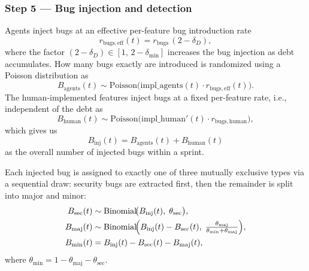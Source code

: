 \documentclass[smallextended]{svjour3}       %
\begin{document}
\subsubsection*{Step 5 --- Bug injection and detection}
Agents inject bugs at an effective per-feature bug introduction rate
\begin{equation}
  r_\mathrm{bugs,eff}(t) = r_\mathrm{bugs}\,(2 - \delta_D),
  \label{eq:r_bugs_eff}
\end{equation}
where the factor $(2 - \delta_D) \in [1,\, 2 - \delta_\mathrm{min}]$ increases the bug injection as debt accumulates. How many bugs exactly are introduced is randomized using a Poisson distribution as
\begin{equation}
  B_\mathrm{agents}(t) \sim
    \mathrm{Poisson}\!\bigl(\mathrm{impl\_agents}(t)\cdot r_\mathrm{bugs,eff}(t)\bigr).
  \label{eq:Binj-agent}
\end{equation}
The human-implemented features inject bugs at a fixed per-feature rate, i.e., independent of the debt as
\begin{equation}
  B_\mathrm{human}(t)  \sim
    \mathrm{Poisson}\!\bigl(\mathrm{impl\_human}'(t)\cdot r_\mathrm{bugs,human}\bigr),
  \label{eq:Binj-human}
\end{equation}
which gives us
\begin{equation}
  B_\mathrm{inj}(t) = B_\mathrm{agents}(t) + B_\mathrm{human}(t)
  \label{eq:Binj-total}
\end{equation}
as the overall number of injected bugs within a sprint. 

Each injected bug is assigned to exactly one of three mutually exclusive types via
a sequential draw: security bugs are extracted first, then the remainder is split
into major and minor:
\begin{align}
  B_\mathrm{sec}(t) &\sim \mathrm{Binomial}\!\bigl(B_\mathrm{inj}(t),\;\theta_\mathrm{sec}\bigr),
    \nonumber \\
  B_\mathrm{maj}(t) &\sim \mathrm{Binomial}\!\Bigl(B_\mathrm{inj}(t)-B_\mathrm{sec}(t),\;
    \tfrac{\theta_\mathrm{maj}}{\theta_\mathrm{min}+\theta_\mathrm{maj}}\Bigr),
    \nonumber \\
  B_\mathrm{min}(t) &= B_\mathrm{inj}(t) - B_\mathrm{sec}(t) - B_\mathrm{maj}(t),
  \label{eq:type_split}
\end{align}
where $\theta_\mathrm{min} = 1 - \theta_\mathrm{maj} - \theta_\mathrm{sec}$.
\end{document}
